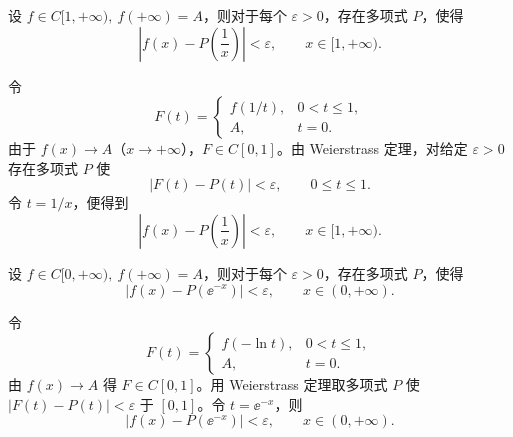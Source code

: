 \begin{xreferenceproblem}[12]
设 $f\in C[1,+\infty),\ f(+\infty)=A$，则对于每个 $\varepsilon>0$，存在多项式 $P$，使得
\[
  \left|f(x)-P\left(\frac1x\right)\right|<\varepsilon,\qquad x\in[1,+\infty).
\]
\end{xreferenceproblem}
\begin{xsolution}
令
\[
  F(t)=
  \begin{cases}
    f(1/t),&0<t\leqslant1,\\
    A,&t=0.
  \end{cases}
\]
由于 $f(x)\to A$（$x\to+\infty$），$F\in C[0,1]$。由 Weierstrass 定理，对给定 $\varepsilon>0$ 存在多项式 $P$ 使
\[
  |F(t)-P(t)|<\varepsilon,
  \qquad0\leqslant t\leqslant1.
\]
令 $t=1/x$，便得到
\[
  \left|f(x)-P\left(\frac1x\right)\right|<\varepsilon,
  \qquad x\in[1,+\infty).
\]
\end{xsolution}


\begin{xreferenceproblem}[13]
设 $f\in C[0,+\infty),\ f(+\infty)=A$，则对于每个 $\varepsilon>0$，存在多项式 $P$，使得
\[
  |f(x)-P(\ee^{-x})|<\varepsilon,\qquad x\in(0,+\infty).
\]
\end{xreferenceproblem}
\begin{xsolution}
令
\[
  F(t)=
  \begin{cases}
    f(-\ln t),&0<t\leqslant1,\\
    A,&t=0.
  \end{cases}
\]
由 $f(x)\to A$ 得 $F\in C[0,1]$。用 Weierstrass 定理取多项式 $P$ 使 $|F(t)-P(t)|<\varepsilon$ 于 $[0,1]$。令 $t=\ee^{-x}$，则
\[
  |f(x)-P(\ee^{-x})|<\varepsilon,
  \qquad x\in(0,+\infty).
\]
\end{xsolution}


